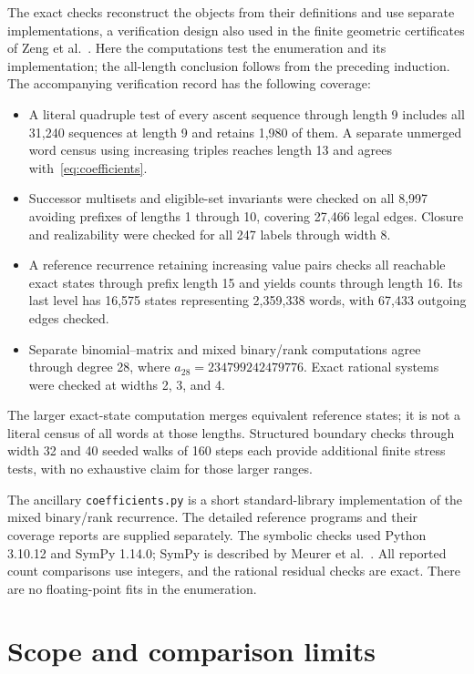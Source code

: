 \documentclass[11pt]{article}
\theoremstyle{remark}
\begin{document}
The exact checks reconstruct the objects from their definitions and use
separate implementations, a verification design also used in the finite
geometric certificates of Zeng et al.~\cite{Zeng2026}.
Here the computations test the enumeration and its implementation;
the all-length conclusion follows from the preceding induction.
The accompanying verification record has the following coverage:
\begin{itemize}
\item A literal quadruple test of every ascent sequence through length
9 includes all 31,240 sequences at length 9 and retains 1,980 of them.
A separate unmerged word census using increasing triples reaches
length 13 and agrees with~\eqref{eq:coefficients}.
\item Successor multisets and eligible-set invariants were checked on
all 8,997 avoiding prefixes of lengths 1 through 10, covering 27,466
legal edges. Closure and realizability were checked for all 247 labels
through width 8.
\item A reference recurrence retaining increasing value pairs checks
all reachable exact states through prefix length 15 and yields counts
through length 16. Its last level has 16,575 states representing
2,359,338 words, with 67,433 outgoing edges checked.
\item Separate binomial--matrix and mixed binary/rank computations
agree through degree 28, where $a_{28}=234799242479776$.
Exact rational systems were checked at widths 2, 3, and 4.
\end{itemize}
The larger exact-state computation merges equivalent reference states;
it is not a literal census of all words at those lengths. Structured
boundary checks through width 32 and 40 seeded walks of 160 steps each
provide additional finite stress tests, with no exhaustive claim for
those larger ranges.

The ancillary \texttt{coefficients.py} is a short standard-library
implementation of the mixed binary/rank recurrence. The detailed
reference programs and their coverage reports are supplied separately.
The symbolic checks used Python 3.10.12 and SymPy 1.14.0;
SymPy is described by Meurer et al.~\cite{SymPy2017}.
All reported count comparisons use integers, and the rational residual
checks are exact. There are no floating-point fits in the enumeration.

\section{Scope and comparison limits}
\end{document}
